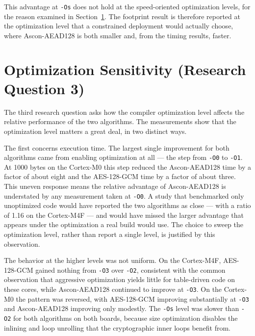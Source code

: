 This advantage at \texttt{-Os} does not hold at the speed-oriented optimization
levels, for the reason examined in Section~\ref{sec:optlevel}.
The footprint result is therefore reported at the optimization level that a
constrained deployment would actually choose, where Ascon-AEAD128 is both
smaller and, from the timing results, faster.

\section{Optimization Sensitivity (Research Question 3)}
\label{sec:optlevel}

The third research question asks how the compiler optimization level affects the
relative performance of the two algorithms.
The measurements show that the optimization level matters a great deal, in two
distinct ways.

The first concerns execution time.
The largest single improvement for both algorithms came from enabling
optimization at all --- the step from \texttt{-O0} to \texttt{-O1}.
At 1000 bytes on the Cortex-M0 this step reduced the Ascon-AEAD128 time by a
factor of about eight and the AES-128-GCM time by a factor of about three.
This uneven response means the relative advantage of Ascon-AEAD128 is
understated by any measurement taken at \texttt{-O0}.
A study that benchmarked only unoptimized code would have reported the two
algorithms as close --- with a ratio of 1.16 on the Cortex-M4F --- and would
have missed the larger advantage that appears under the optimization a real
build would use.
The choice to sweep the optimization level, rather than report a single level,
is justified by this observation.

The behavior at the higher levels was not uniform.
On the Cortex-M4F, AES-128-GCM gained nothing from \texttt{-O3} over
\texttt{-O2}, consistent with the common observation that aggressive
optimization yields little for table-driven code on these cores, while
Ascon-AEAD128 continued to improve at \texttt{-O3}.
On the Cortex-M0 the pattern was reversed, with AES-128-GCM improving
substantially at \texttt{-O3} and Ascon-AEAD128 improving only modestly.
The \texttt{-Os} level was slower than \texttt{-O2} for both algorithms on both
boards, because size optimization disables the inlining and loop unrolling that
the cryptographic inner loops benefit from.

